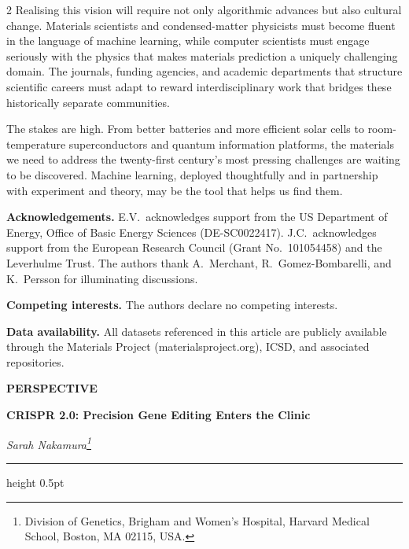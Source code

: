 \documentclass[a4paper,11pt]{article}
\newcommand{\byline}[1]{%
  \vspace{4pt}
  {\sffamily\itshape\color{graytext}#1\par}
  \vspace{2pt}
  {\color{lightrule}\hrule height 0.5pt}
  \vspace{10pt}
}
\begin{document}
\begin{multicols}{2}
\medskip
Realising this vision will require not only algorithmic advances but also
cultural change. Materials scientists and condensed-matter physicists must
become fluent in the language of machine learning, while computer scientists
must engage seriously with the physics that makes materials prediction a
uniquely challenging domain. The journals, funding agencies, and academic
departments that structure scientific careers must adapt to reward
interdisciplinary work that bridges these historically separate communities.

\medskip
The stakes are high. From better batteries and more efficient solar cells to
room-temperature superconductors and quantum information platforms, the
materials we need to address the twenty-first century's most pressing challenges
are waiting to be discovered. Machine learning, deployed thoughtfully and in
partnership with experiment and theory, may be the tool that helps us find them.

\vspace{8pt}
{\sffamily\footnotesize\color{graytext}
\textbf{Acknowledgements.} E.V.\ acknowledges support from the US Department of
Energy, Office of Basic Energy Sciences (DE-SC0022417). J.C.\ acknowledges
support from the European Research Council (Grant No.\ 101054458) and the
Leverhulme Trust. The authors thank A.\ Merchant, R.\ Gomez-Bombarelli, and
K.\ Persson for illuminating discussions.
}

\vspace{4pt}
{\sffamily\footnotesize\color{graytext}
\textbf{Competing interests.} The authors declare no competing interests.
}

\vspace{6pt}
{\sffamily\footnotesize\color{graytext}
\textbf{Data availability.} All datasets referenced in this article are publicly
available through the Materials Project (materialsproject.org), ICSD, and
associated repositories.
}

\end{multicols}

\newpage

{\sffamily\bfseries\color{accent2}\footnotesize\MakeUppercase{Perspective}}

\vspace{4pt}
{\sffamily\bfseries\fontsize{24}{30}\selectfont\color{accent}
CRISPR 2.0: Precision Gene Editing Enters the Clinic}

\byline{Sarah Nakamura\thanks{Division of Genetics, Brigham and Women's Hospital,
Harvard Medical School, Boston, MA 02115, USA.}}
\end{document}
